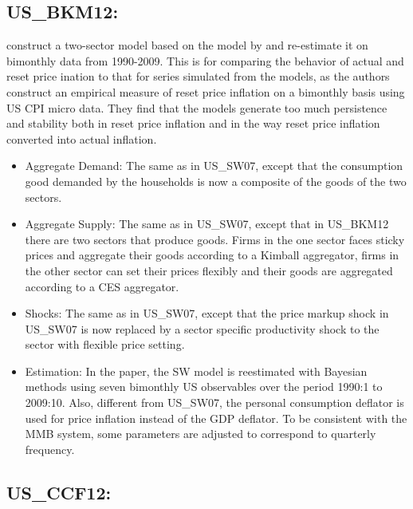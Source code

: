 \documentclass[11pt,a4paper]{article}
\begin{document}
	
	\subsection{US\_BKM12: \cite{bils2012reset}}
	\label{USBKM12}
	\cite{bils2012reset} construct a two-sector model based on the model by  \cite{SmetsWouters2007} and re-estimate it on bimonthly data from 1990-2009. This is for comparing the behavior of actual and reset price ination to that for series simulated from the models, as the authors construct an empirical measure of reset price inflation on a bimonthly basis using US CPI micro data. They find that the models generate too much persistence and stability both in reset price inflation and in the way reset price inflation converted into actual inflation.
	
	\begin{itemize}
		\item Aggregate Demand: The same as in US\_SW07, except that the consumption good demanded by the households is now a composite of the goods of the two sectors.
		
		\item Aggregate Supply: The same as in US\_SW07, except that in US\_BKM12 there are two sectors that produce goods. Firms in the one sector faces sticky prices and aggregate their goods according to a Kimball aggregator, firms in the other sector can set their prices flexibly and their goods are aggregated according to a CES aggregator.
		
		\item Shocks: The same as in US\_SW07, except that the price markup shock in US\_SW07 is now replaced by a sector specific productivity shock to the sector with flexible price setting.
		
		\item Estimation: In the paper, the SW model is reestimated with Bayesian methods
		using seven bimonthly US observables over the period 1990:1 to 2009:10. Also, different
		from US\_SW07, the personal consumption deflator is used for price inflation instead of the
		GDP deflator. To be consistent with the MMB system, some parameters are adjusted to
		correspond to quarterly frequency.
	\end{itemize}
	
	
	\subsection{US\_CCF12: \cite{chen2012macroeconomic}}
	\label{USCCF12} 
	
\end{document}
